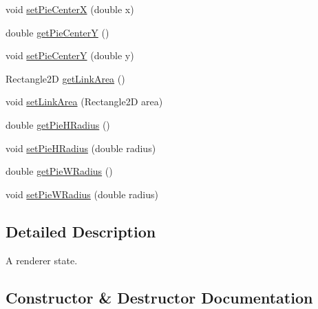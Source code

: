 \begin{DoxyCompactItemize}
\item 
void \mbox{\hyperlink{classorg_1_1jfree_1_1chart_1_1plot_1_1_pie_plot_state_a90a324e65399e3b32cde6faa0a87487e}{set\+Pie\+CenterX}} (double x)
\item 
double \mbox{\hyperlink{classorg_1_1jfree_1_1chart_1_1plot_1_1_pie_plot_state_adc60b8c9c69624edb77b5fc87bd973ab}{get\+Pie\+CenterY}} ()
\item 
void \mbox{\hyperlink{classorg_1_1jfree_1_1chart_1_1plot_1_1_pie_plot_state_ad3ac929a4712a90353b5276f8691e87b}{set\+Pie\+CenterY}} (double y)
\item 
Rectangle2D \mbox{\hyperlink{classorg_1_1jfree_1_1chart_1_1plot_1_1_pie_plot_state_a20821e8c1650c38338e7b38a1f17f1eb}{get\+Link\+Area}} ()
\item 
void \mbox{\hyperlink{classorg_1_1jfree_1_1chart_1_1plot_1_1_pie_plot_state_a1d06b3c8b1fbe792629d8871c4c99422}{set\+Link\+Area}} (Rectangle2D area)
\item 
double \mbox{\hyperlink{classorg_1_1jfree_1_1chart_1_1plot_1_1_pie_plot_state_a047569663a4aaffbc2e8ea0d4b67c247}{get\+Pie\+H\+Radius}} ()
\item 
void \mbox{\hyperlink{classorg_1_1jfree_1_1chart_1_1plot_1_1_pie_plot_state_ae12f2fff3e520bc2a7fd592a2dbc843f}{set\+Pie\+H\+Radius}} (double radius)
\item 
double \mbox{\hyperlink{classorg_1_1jfree_1_1chart_1_1plot_1_1_pie_plot_state_ac5cad70ad05db70c9fe99dfc05609ffc}{get\+Pie\+W\+Radius}} ()
\item 
void \mbox{\hyperlink{classorg_1_1jfree_1_1chart_1_1plot_1_1_pie_plot_state_a36df269d9579c40b905c64ed0ac4248b}{set\+Pie\+W\+Radius}} (double radius)
\end{DoxyCompactItemize}


\subsection{Detailed Description}
A renderer state. 

\subsection{Constructor \& Destructor Documentation}
\mbox{\label{classorg_1_1jfree_1_1chart_1_1plot_1_1_pie_plot_state_a4977e2c8991281a9dd2a387b5b90e938}} 
